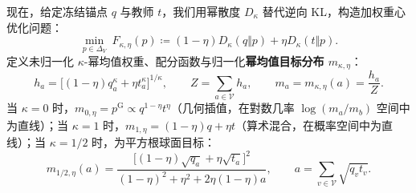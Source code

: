 \documentclass[lang=cn,scheme=chinese,openany]{../book/elegantbook}
\begin{document}
现在，给定冻结锚点 $q$ 与教师 $t$，我们用幂散度 $D_\kappa$ 替代逆向 KL，构造加权重心优化问题：
\begin{equation}
 \min_{p\in\Delta_V}\ F_{\kappa,\eta}(p)\coloneqq(1-\eta)D_\kappa(q\Vert p)+\eta D_\kappa(t\Vert p).
 \label{eq:proximal-divergence-barycenter}
\end{equation}
定义未归一化 $\kappa$-幂均值权重、配分函数与归一化\textbf{幂均值目标分布 $m_{\kappa,\eta}$}：
\begin{equation}
 h_a=\bigl[(1-\eta)q_a^\kappa+\eta t_a^\kappa\bigr]^{1/\kappa},\qquad
 Z=\sum_{a\in\mathcal V} h_a,\qquad
 m_a=m_{\kappa,\eta}(a)=\frac{h_a}{Z}.
 \label{eq:proximal-power-target}
\end{equation}
当 $\kappa=0$ 时，$m_{0,\eta}=p^{\mathrm G}\propto q^{1-\eta}t^\eta$（几何插值，在對数几率 $\log(m_a/m_b)$ 空间中为直线）；当 $\kappa=1$ 时，$m_{1,\eta}=(1-\eta)q+\eta t$（算术混合，在概率空间中为直线）；当 $\kappa=1/2$ 时，为平方根球面目标：
\begin{equation}
 m_{1/2,\eta}(a)=\frac{\bigl[(1-\eta)\sqrt{q_a}+\eta\sqrt{t_a}\bigr]^2}
 {(1-\eta)^2+\eta^2+2\eta(1-\eta)a},\qquad
 a=\sum_{v\in\mathcal V}\sqrt{q_v t_v}.
 \label{eq:proximal-square-root}
\end{equation}
\end{document}
